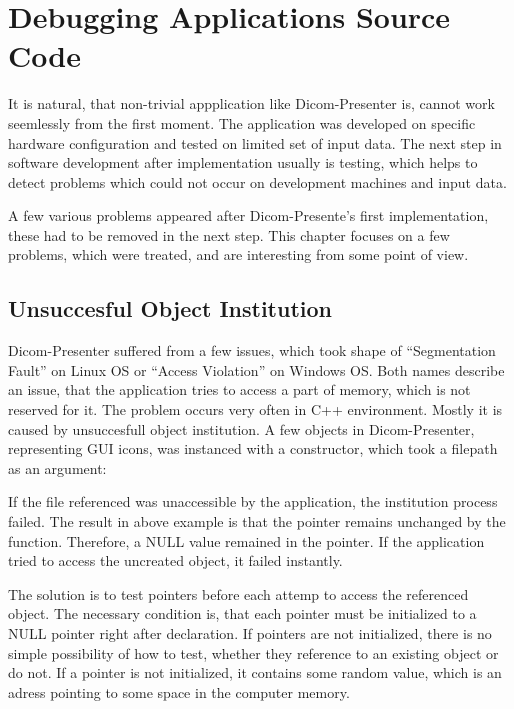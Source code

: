 \chapter{Debugging Applications Source Code}
\vspace{-10mm}
It is natural, that non-trivial appplication like Dicom-Presenter is, cannot work seemlessly from the first moment. The application was developed on specific hardware configuration and tested on limited set of input data. The next step in software development after implementation usually is testing, which helps to detect problems which could not occur on development machines and input data.

A few various problems appeared after Dicom-Presente's first implementation, these had to be removed in the next step. This chapter focuses on a few problems, which were treated, and are interesting from some point of view.

\section{Unsuccesful Object Institution}
Dicom-Presenter suffered from a few issues, which took shape of ``Segmentation Fault'' on Linux OS or ``Access Violation'' on Windows OS. Both names describe an issue, that the application tries to access a part of memory, which is not reserved for it. The problem occurs very often in C++ environment. Mostly it is caused by unsuccesfull object institution. A few objects in Dicom-Presenter, representing GUI icons, was instanced with a constructor, which took a filepath as an argument:


If the file referenced was unaccessible by the application, the institution process failed. The result in above example is that the  pointer remains unchanged by the  function. Therefore, a NULL value remained in the pointer. If the application tried to access the uncreated object, it failed instantly.

The solution is to test pointers before each attemp to access the referenced object. The necessary condition is, that each pointer  must be initialized to a NULL pointer right after declaration. If pointers are not initialized, there is no simple possibility of how to test, whether they reference to an existing object or do not. If a pointer is not initialized, it contains some random value, which is an adress pointing to some space in the computer memory.